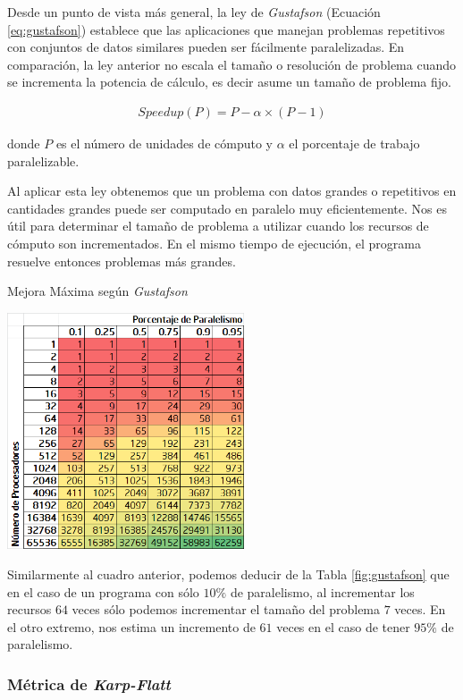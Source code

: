 \documentclass[a4paper]{report}
\begin{document}
Desde un punto de vista más general, la ley de {\it Gustafson} \cite{gustafson} (Ecuación \ref{eq:gustafson}) establece que las aplicaciones que manejan problemas
repetitivos con conjuntos de datos similares pueden ser fácilmente paralelizadas. En comparación, la ley anterior no escala el tamaño o
resolución de problema cuando se incrementa la potencia de cálculo, es decir asume un tamaño de problema fijo. 

\begin{eqnarray}
\label{eq:gustafson}
Speedup(P) = P - \alpha \times (P - 1)
\end{eqnarray}

donde $ P $ es el número de unidades de cómputo y $ \alpha $ el porcentaje de trabajo paralelizable.

\bigskip

Al aplicar esta ley obtenemos que un problema con datos grandes o repetitivos en cantidades grandes puede ser computado en paralelo muy eficientemente.
Nos es útil para determinar el tamaño de problema a utilizar cuando los recursos de cómputo son incrementados. 
En el mismo tiempo de ejecución, el programa resuelve entonces problemas más grandes.

\begin{table}[H]
\caption{Mejora Máxima según {\it Gustafson}}
\centering
\includegraphics[width=7cm]{gustafson.png}
\label{fig:gustafson}
\end{table}

Similarmente al cuadro anterior, podemos deducir de la Tabla \ref{fig:gustafson} que en el caso de un programa con sólo $ 10\% $ de paralelismo, al incrementar los recursos $ 64 $ veces sólo podemos incrementar el tamaño del problema $ 7 $ veces. En el otro extremo, nos estima un incremento de $ 61 $ veces en el caso de tener $ 95\% $ de paralelismo.

\subsubsection{Métrica de {\it Karp-Flatt}}
\end{document}
